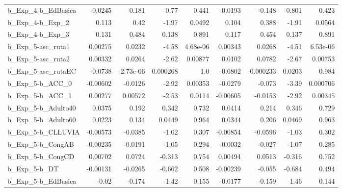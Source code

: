 \begin{tabular}{lrrrrrrrr}
b\_Exp\_4-b\_EdBasica         &     -0.0245 &       -0.181 &     -0.77 &    0.441 &    -0.0193 &      -0.148 &       -0.801 &         0.423 \\
b\_Exp\_4-b\_Exp\_2            &       0.113 &         0.42 &     -1.97 &   0.0492 &      0.104 &       0.388 &        -1.91 &        0.0564 \\
b\_Exp\_4-b\_Exp\_3            &       0.131 &        0.484 &     0.138 &    0.891 &      0.117 &       0.454 &        0.137 &         0.891 \\
b\_Exp\_5-asc\_ruta1          &     0.00275 &       0.0232 &     -4.58 & 4.68e-06 &    0.00343 &      0.0268 &        -4.51 &      6.53e-06 \\
b\_Exp\_5-asc\_ruta2          &     0.00332 &       0.0264 &     -2.62 &  0.00877 &     0.0102 &      0.0782 &        -2.67 &       0.00753 \\
b\_Exp\_5-asc\_rutaEC         &     -0.0738 &    -2.73e-06 &  0.000268 &      1.0 &    -0.0802 &   -0.000233 &       0.0203 &         0.984 \\
b\_Exp\_5-b\_ACC\_0            &    -0.00602 &      -0.0126 &     -2.92 &  0.00353 &    -0.0279 &      -0.073 &        -3.39 &      0.000706 \\
b\_Exp\_5-b\_ACC\_1            &     0.00277 &      0.00572 &     -2.53 &   0.0114 &   -0.00605 &     -0.0153 &        -2.92 &       0.00345 \\
b\_Exp\_5-b\_Adulto40         &      0.0375 &        0.192 &     0.342 &    0.732 &     0.0414 &       0.214 &        0.346 &         0.729 \\
b\_Exp\_5-b\_Adulto60         &      0.0223 &        0.134 &    0.0449 &    0.964 &     0.0344 &       0.206 &       0.0469 &         0.963 \\
b\_Exp\_5-b\_CLLUVIA          &    -0.00573 &      -0.0385 &     -1.02 &    0.307 &   -0.00854 &     -0.0596 &        -1.03 &         0.302 \\
b\_Exp\_5-b\_CongAB           &    -0.00235 &      -0.0191 &     -1.05 &    0.294 &    -0.0032 &      -0.027 &        -1.07 &         0.285 \\
b\_Exp\_5-b\_CongCD           &     0.00702 &       0.0724 &    -0.313 &    0.754 &    0.00494 &      0.0513 &       -0.316 &         0.752 \\
b\_Exp\_5-b\_DT               &    -0.00131 &      -0.0265 &    -0.662 &    0.508 &   -0.00239 &      -0.055 &       -0.684 &         0.494 \\
b\_Exp\_5-b\_EdBasica         &       -0.02 &       -0.174 &     -1.42 &    0.155 &    -0.0177 &      -0.159 &        -1.46 &         0.144 \\

\end{tabular}
